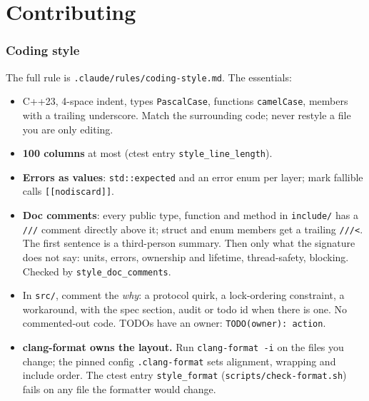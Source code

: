 \documentclass[11pt,a4paper]{article}
\newcommand{\code}[1]{\texttt{#1}}
\newcommand{\file}[1]{\texttt{#1}}
\begin{document}
\part{Contributing}

\section{Coding style}

The full rule is \file{.claude/rules/coding-style.md}. The essentials:

\begin{itemize}
  \item C++23, 4-space indent, types \code{PascalCase}, functions \code{camelCase}, members with a
        trailing underscore. Match the surrounding code; never restyle a file you are only editing.
  \item \textbf{100 columns} at most (ctest entry \code{style\_line\_length}).
  \item \textbf{Errors as values}: \code{std::expected} and an error enum per layer; mark fallible
        calls \code{[[nodiscard]]}.
  \item \textbf{Doc comments}: every public type, function and method in \file{include/} has a
        \code{///} comment directly above it; struct and enum members get a trailing
        \code{///<}. The first sentence is a third-person summary. Then only what the signature
        does not say: units, errors, ownership and lifetime, thread-safety, blocking. Checked by
        \code{style\_doc\_comments}.
  \item In \file{src/}, comment the \emph{why}: a protocol quirk, a lock-ordering constraint, a
        workaround, with the spec section, audit or todo id when there is one. No commented-out
        code. TODOs have an owner: \code{TODO(owner): action}.
  \item \textbf{clang-format owns the layout.} Run \code{clang-format -i} on the files you change;
        the pinned config \file{.clang-format} sets alignment, wrapping and include order. The
        ctest entry \code{style\_format} (\file{scripts/check-format.sh}) fails on any file the
        formatter would change.
\end{itemize}

\end{document}

